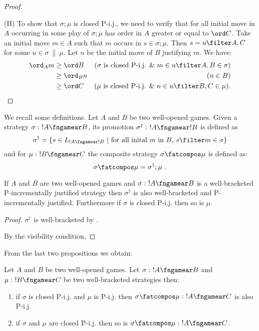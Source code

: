 \begin{proof}
\begin{enumerate}[1)]
\begin{enumerate}
\end{enumerate} 
\end{enumerate} 

\noindent (II)
To show that $\sigma;\mu$ is closed P-i.j., we need to verify that for all initial move in $A$ occurring in some play of $\sigma ; \mu$ has order in $A$ greater or equal to $\ord C$.
Take an initial move $m \in A$ such that $m$ occurs in $s \in \sigma ; \mu$. Then $s = u \filter A,C$ for some $u \in \sigma 
\ \|\ \mu$. Let $n$ be the initial move of $B$ justifying $m$.
 We have:
\begin{align*}
\ord_A m & \geq \ord B & \mbox{($\sigma$ is closed P-i.j. \& $m \in u
\filter A,B \in \sigma$)} \\
 & \geq \ord_B n & \mbox{($n 
\in B$)} \\
 & \geq \ord C & \mbox{($\mu$ is closed P-i.j. \& $n \in u
\filter B,C \in \mu$)}.
\end{align*}
\end{proof}
We recall some definitions. Let $A$ and $B$ be two well-opened games. Given a strategy  $\sigma :\ !A \fngamear B$, its promotion $\sigma^\dag :\ !A\fngamear !B$ is defined as
$$ \sigma^\dag = \{ s \in L_{!A\fngamear !B}\ |\ \mbox{for all inital $m$ in $B$, } s\filter m \in \sigma \}$$
and for $\mu :\ !B\fngamear C$ the composite strategy $\sigma \fatcompos \mu$ is defined as:
$$ \sigma \fatcompos \mu = \sigma^\dag ; \mu \ .$$

\begin{proposition}
If $A$ and $B$ are two well-opened games 
and $\sigma :\ !A \fngamear B$ is a well-bracketed P-incrementally justified strategy then $\sigma^\dag$ is also well-bracketed and P-incrementally justified.
Furthermore if $\sigma$ is closed P-i.j. then so is
$\mu$.
\end{proposition}
\begin{proof}
$\sigma^\dag$ is well-bracketed by \cite[Proposition 2.10.]{abramsky94full}.

By the visibility condition,
\end{proof}

From the last two propositions we obtain:
\begin{corollary}
Let $A$ and $B$ be two well-opened games. Let
$\sigma :\ !A \fngamear B$ and $\mu :\ !B\fngamear C$ be two well-bracketed strategies then:
\begin{enumerate}
\item if $\sigma$ is closed P-i.j. 
and $\mu$ is P-i.j. then $\sigma \fatcompos \mu :\ !A \fngamear C$ is also P-i.j.
\item if $\sigma$ and $\mu$ are closed P-i.j. then so is $\sigma \fatcompos \mu :\ !A \fngamear C$.
\end{enumerate}
\end{corollary}


